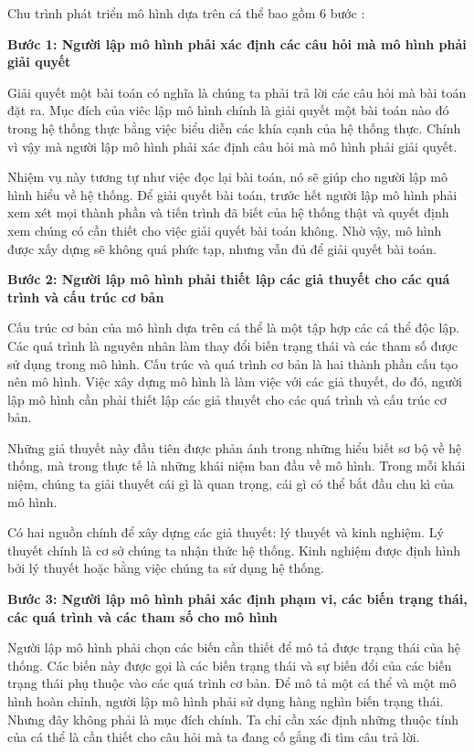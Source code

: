 \documentclass[13pt]{extreport}
\begin{document}
Chu trình phát triển mô hình dựa trên cá thể bao gồm 6 bước \cite{grim05}:

\textbf{Bước 1: Người lập mô hình phải xác định các câu hỏi mà mô hình phải giải quyết}

Giải quyết  một bài toán có nghĩa là chúng ta phải trả lời các câu hỏi mà bài toán đặt ra. Mục đích của viêc lập mô hình chính là giải quyết một bài toán nào đó trong hệ thống thực bằng việc biểu diễn các khía cạnh của hệ thống thực. Chính vì vậy mà người lập mô hình phải xác định câu hỏi mà mô hình phải giải quyết.

Nhiệm vụ này tương tự như việc đọc lại bài toán, nó sẽ giúp cho người lập mô hình hiểu về hệ thống. Để giải quyết bài toán, trước hết người lập mô hình phải xem xét mọi thành phần và tiến trình đã biết của hệ thống thật và quyết định xem chúng có cần thiết cho việc giải quyết bài toán không. Nhờ vậy, mô hình được xấy dựng sẽ không quá phức tạp, nhưng vẫn đủ để giải quyết bài toán.

\textbf{Bước 2: Người lập mô hình phải thiết lập các giả thuyết cho các quá trình và cấu trúc cơ bản}

Cấu trúc cơ bản của mô hình dựa trên cá thể là một tập hợp các cá thể độc lập. Các quá trình là nguyên nhân làm thay đổi biến trạng thái và các tham số được sử dụng trong mô hình. Cấu trúc và quá trình cơ bản là hai thành phần cấu tạo nên mô hình. Việc xây dựng mô hình là làm việc với các giả thuyết, do đó, người lập mô hình cần phải thiết lập các giả thuyết cho các quá trình và cấu trúc cơ bản.

Những giả thuyết này đầu tiên được phản ánh trong những hiểu biết sơ bộ về hệ thống, mà trong thực tế là những khái niệm ban đầu về mô hình. Trong mỗi khái niệm, chúng ta giải thuyết cái gì là quan trọng, cái gì có thể bắt đầu chu kì của mô hình.

Có hai nguồn chính để xây dựng các giả thuyết: lý thuyết và kinh nghiệm. Lý thuyết chính là cơ sở chúng ta nhận thức hệ thống. Kinh nghiệm được định hình bởi lý thuyết hoặc bằng việc chúng ta sử dụng hệ thống.

\textbf{Bước 3: Người lập mô hình phải xác định phạm vi, các biến trạng thái, các quá trình và các tham số cho mô hình}

Người lập mô hình phải chọn các biến cần thiết để mô tả được trạng thái của hệ thống. Các biến này được gọi là các biến trạng thái và sự biến đổi của các biến trạng thái phụ thuộc vào các quá trình cơ bản. Để mô tả một cá thể và một mô hình hoàn chỉnh, người lập mô hình phải sử dụng hàng nghìn biến trạng thái. Nhưng đây không phải là mục đích chính. Ta chỉ cần xác định những thuộc tính của cá thể là cần thiết cho câu hỏi mà ta đang cố gắng đi tìm câu trả lời.
\end{document}
